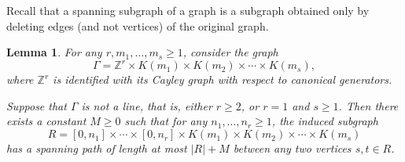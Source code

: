 \documentclass[reqno,oneside]{amsart}
\newcommand{\Z}{\mathbb{Z}}
\theoremstyle{plain}
\newtheorem{lem}[thm]{Lemma}
\theoremstyle{definition}
\begin{document}
Recall that a spanning subgraph of a graph is a subgraph obtained only by deleting edges (and not vertices) of the original graph.
\begin{lem}\label{lem: rectangles are quasi-Hamiltonian-connected} For any $r,m_1,\ldots,m_s\ge 1$, consider the graph 
	$$\Gamma=\Z^r\times K(m_1)\times K(m_2)\times \cdots \times K(m_s),$$
	where $\Z^r$ is identified with its Cayley graph with respect to canonical generators.
	
	
	Suppose that $\Gamma$ is not a line, that is, either $r\ge 2$, or $r=1$ and $s\ge 1$. Then there exists a constant $M\ge 0$ such that for any $n_1,\ldots,n_r\ge 1$, the induced subgraph
	$$
	R=[0,n_1]\times \cdots \times [0,n_r]\times  K(m_1)\times K(m_2)\times \cdots \times K(m_s)
	$$
	has a spanning path of length at most $|R|+M$ between any two vertices $s,t\in R$.
\end{lem}
\end{document}
